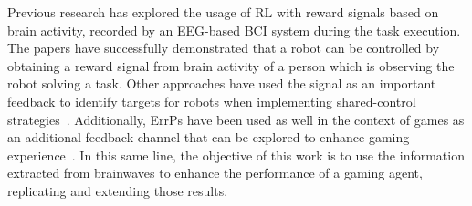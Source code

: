 \documentclass[journal]{IEEEtran}
\begin{document}

Previous research has explored the usage of RL with reward signals based on brain activity, recorded by an EEG-based BCI system during the task execution. The papers \cite{ROBOT-CONTROL-PAPER,Omedes2013} have successfully demonstrated that a robot can be controlled by obtaining a reward signal from brain activity of a person which is observing the robot solving a task.  Other approaches have used the signal as an important feedback to identify targets for robots when implementing shared-control strategies~\cite{Schiatti2018}.  Additionally, ErrPs have been used as well in the context of games as an additional feedback channel that can be explored to enhance gaming experience~\cite{Plass-OudeBos2010,kober2018bci}.  In this same line, the objective of this work is to use the information extracted from brainwaves to enhance the performance of a gaming agent, replicating and extending those results.




%
%

\end{document}
